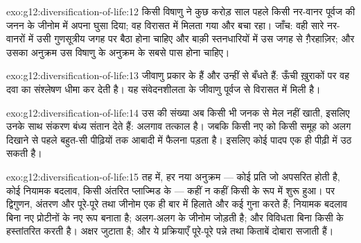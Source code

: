 \begin{solution}{exo:g12:diversification-of-life:12}
किसी विषाणु ने कुछ करोड़ साल पहले किसी नर-वानर पूर्वज की जनन  के
जीनोम में अपना  घुसा दिया; वह  विरासत में मिलता गया और बचा रहा।
जाँच: वही  सारे नर-वानरों में उसी गुणसूत्रीय जगह पर बैठा होना चाहिए और
बाक़ी स्तनधारियों में उस जगह से ग़ैरहाज़िर; और उसका अनुक्रम उस विषाणु के
अनुक्रम के सबसे पास होना चाहिए।
\end{solution}

\begin{solution}{exo:g12:diversification-of-life:13}
  जीवाणु प्रकार के हैं और उन्हीं  से बँधते
हैं: ऊँची ख़ुराकों पर वह दवा  का  संश्लेषण धीमा कर देती
है। यह संवेदनशीलता  के जीवाणु पूर्वज से विरासत में मिली है।
\end{solution}

\begin{solution}{exo:g12:diversification-of-life:14}
उस  की  संख्या अब किसी भी जनक से मेल नहीं खाती, इसलिए उनके
साथ संकरण बंध्य संतान देते हैं: अलगाव तत्काल है। जबकि किसी नए 
को किसी समूह को अलग दिखाने से पहले बहुत-सी पीढ़ियों तक आबादी में फैलना पड़ता
है। इसलिए कोई पादप  एक ही पीढ़ी में उठ सकती है।
\end{solution}

\begin{solution}{exo:g12:diversification-of-life:15}
तह में, हर नया अनुक्रम --- कोई  प्रति जो अपसरित होती है, कोई
नियामक बदलाव, किसी अंतरित प्लाज्मिड के  --- कहीं न कहीं किसी 
के रूप में शुरू हुआ। पर द्विगुणन, अंतरण और  पूरे-पूरे  तथा
जीनोम एक ही बार में हिलाते और कई गुना करते हैं; नियामक बदलाव बिना नए
प्रोटीनों के नए रूप बनाता है;  अलग-अलग  के जीनोम जोड़ती है;
और  विविधता बिना किसी  के हस्तांतरित करती है।  अक्षर
जुटाता है; और ये प्रक्रियाएँ पूरे-पूरे पन्ने तथा किताबें दोबारा सजाती हैं।
\end{solution}

